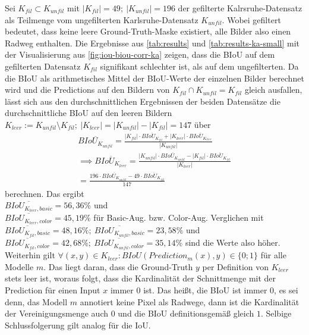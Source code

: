 Sei $K_{fil} \subset K_{unfil}$ mit $|K_{fil}| = 49; ~|K_{unfil}| = 196$ der gefilterte Kalrsruhe-Datensatz 
als Teilmenge vom ungefilterten Karlsruhe-Datensatz $K_{unfil}$. Wobei gefiltert bedeutet, dass 
keine leere Ground-Truth-Maske existiert, alle Bilder also einen Radweg enthalten.
Die Ergebnisse aus \autoref{tab:results} und \autoref{tab:results-ka-small} mit der Visualisierung aus 
\autoref{fig:iou-biou-corr-ka} zeigen, dass die BIoU auf dem gefilterten Datensatz $K_{fil}$ signifikant 
schlechter ist, als auf dem ungefilterten. Da die BIoU als arithmetisches Mittel der BIoU-Werte der einzelnen Bilder 
berechnet wird und die Predictions auf den Bildern von $K_{fil} \cap K_{unfil} = K_{fil}$ gleich ausfallen, 
lässt sich aus den durchschnittlichen Ergebnissen der beiden Datensätze die durchschnittliche BIoU auf den leeren Bildern 
$K_{leer} := K_{unfil} \setminus K_{fil};~ |K_{leer}| = |K_{unfil}| - |K_{fil}| = 147$ über   
\begin{align}
	\overbar{BIoU_{K_{unfil}}} = \frac{|K_{fil}| \cdot \overbar{BIoU_{K_{fil}}} + |K_{leer}| \cdot \overbar{BIoU_{K_{leer}}}}{|K_{unfil}|} \nonumber \\
	\label{eq:ka-empty}  \implies \overbar{BIoU_{K_{leer}}} = \frac{|K_{unfil}| \cdot \overbar{BIoU_{K_{unfil}}} - |K_{fil}| \cdot \overbar{BIoU_{K_{fil}}}}{|K_{leer}|} \\ 
	= \frac{196 \cdot \overbar{BIoU_{K_{unfil}}} - 49 \cdot \overbar{BIoU_{K_{fil}}}}{147} \nonumber
\end{align}
berechnen. Das ergibt \\ 
$\overbar{BIoU_{K_{leer}, basic}} = 56,36\%$ und \\ 
$\overbar{BIoU_{K_{leer}, color}} = 45,19\%$
für Basic-Aug. bzw. Color-Aug. Verglichen mit \\ 
$\overbar{BIoU_{K_{fil}, basic}} = 48,16\%; ~\overbar{BIoU_{K_{unfil}, basic}} = 23,58\%$ und \\
$\overbar{BIoU_{K_{fil}, color}} = 42,68\%; ~\overbar{BIoU_{K_{unfil}, color}} = 35,14\%$
sind die Werte also höher. Weiterhin gilt $\forall (x, y) \in K_{leer}: BIoU(Prediction_m(x), y) \in \{0; 1\}$ für alle Modelle $m$. 
Das liegt daran, dass die Ground-Truth $y$ per Definition von $K_{leer}$ stets leer ist, woraus folgt, dass die Kardinalität der 
Schnittmenge mit der Prediction für einen Input $x$ immer $0$ ist. Das heißt, die BIoU ist immer $0$, es sei denn, 
das Modell $m$ annotiert keine Pixel als Radwege, dann ist die Kardinalität der Vereinigungsmenge auch $0$ und 
die BIoU definitionsgemäß gleich $1$. Selbige Schlussfolgerung gilt analog für die IoU. \\ 
